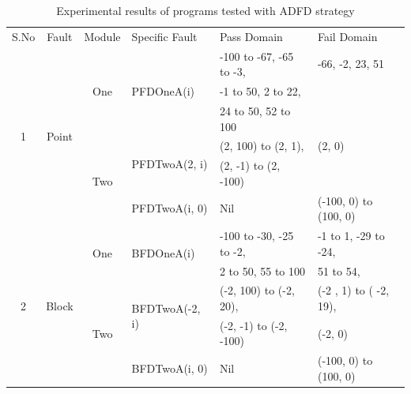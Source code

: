 \begin{table}[h]
\caption{Experimental results of programs tested with ADFD strategy}
\bigskip
\centering
{\renewcommand{\arraystretch}{1.5}
\scriptsize

\begin{tabular}{|c|c|c|l|l|l|}

\hline 


\multirow{2}{*}{S.No}	& \multirow{2}{*}{Fault }	 				& \multirow{2}{*}{Module} 		& \multirow{2}{*}{Specific Fault}	 		& \multirow{2}{*}{Pass Domain} 					& \multirow{2}{*}{Fail Domain} 			\\  
					& Domain								&  Dimension					&									&											&								\\ \hline 
\multirow{6}{*}{1} 	&	\multirow{6}{*}{Point}				& 	\multirow{3}{*}{One}			&	\multirow{3}{*}{PFDOneA(i)}	&	-100 to -67, -65 to -3, 		  		& -66, -2, 23, 51			 	\\  
				&									&							&							&	-1 to 50, 2 to 22, 					&							\\  
				&									&							&							&	24 to 50, 52 to 100					&							\\ \cline{3-6}
				&									&	\multirow{3}{*}{Two}			&	\multirow{2}{*}{PFDTwoA(2, i)}	&	(2, 100) to (2, 1),	 				&  (2, 0)						\\  
				&									&							&							&	(2, -1) to (2, -100)					&							\\ \cline{4-6}
				&									& 							&	PFDTwoA(i, 0)				&	Nil								& (-100, 0) to (100, 0)				\\  \hline



\multirow{5}{*}{2} 	&	\multirow{5}{*}{Block}				& 	\multirow{2}{*}{One}			&	\multirow{2}{*}{BFDOneA(i)}	&	-100 to -30, -25 to -2, 					& 	-1 to 1, -29 to -24,		 	\\ 
				&									&							&							&	2 to 50, 55 to 100						&	51 to 54,				\\   \cline{3-6}
				&									&	\multirow{3}{*}{Two}			&	\multirow{2}{*}{BFDTwoA(-2, i)}	&	(-2, 100) to (-2, 20), 					& 	(-2 , 1) to ( -2, 19), 		\\ 
				&									&							&							&      (-2, -1) to (-2, -100)					&	(-2, 0)				\\ \cline{4-6}
				&									& 							&	BFDTwoA(i, 0)				&	Nil								& 	(-100, 0) to (100, 0)		\\  \hline
				
				




\end{tabular}}
\end{table}

